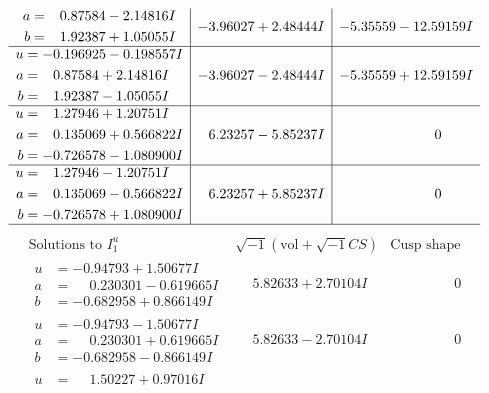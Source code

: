 \documentclass[1p]{elsarticle_modified}
\theoremstyle{definition}
\newcommand{\I}{\sqrt{-1}}
\begin{document}
$$\begin{array}{c|c|c}
\begin{aligned}
a &= \phantom{-}0.87584 - 2.14816 I \\
b &= \phantom{-}1.92387 + 1.05055 I\end{aligned}
 & -3.96027 + 2.48444 I & -5.35559 - 12.59159 I \\ \hline\begin{aligned}
u &= -0.196925 - 0.198557 I \\
a &= \phantom{-}0.87584 + 2.14816 I \\
b &= \phantom{-}1.92387 - 1.05055 I\end{aligned}
 & -3.96027 - 2.48444 I & -5.35559 + 12.59159 I \\ \hline\begin{aligned}
u &= \phantom{-}1.27946 + 1.20751 I \\
a &= \phantom{-}0.135069 + 0.566822 I \\
b &= -0.726578 - 1.080900 I\end{aligned}
 & \phantom{-}6.23257 - 5.85237 I & \phantom{-0.000000 } 0 \\ \hline\begin{aligned}
u &= \phantom{-}1.27946 - 1.20751 I \\
a &= \phantom{-}0.135069 - 0.566822 I \\
b &= -0.726578 + 1.080900 I\end{aligned}
 & \phantom{-}6.23257 + 5.85237 I & \phantom{-0.000000 } 0\\
 \hline 
 \end{array}$$\newpage$$\begin{array}{c|c|c}  
\text{Solutions to }I^u_{1}& \I (\text{vol} + \sqrt{-1}CS) & \text{Cusp shape}\\
 \hline 
\begin{aligned}
u &= -0.94793 + 1.50677 I \\
a &= \phantom{-}0.230301 - 0.619665 I \\
b &= -0.682958 + 0.866149 I\end{aligned}
 & \phantom{-}5.82633 + 2.70104 I & \phantom{-0.000000 } 0 \\ \hline\begin{aligned}
u &= -0.94793 - 1.50677 I \\
a &= \phantom{-}0.230301 + 0.619665 I \\
b &= -0.682958 - 0.866149 I\end{aligned}
 & \phantom{-}5.82633 - 2.70104 I & \phantom{-0.000000 } 0 \\ \hline\begin{aligned}
u &= \phantom{-}1.50227 + 0.97016 I \\

\end{aligned}
\end{array}$$
\end{document}
